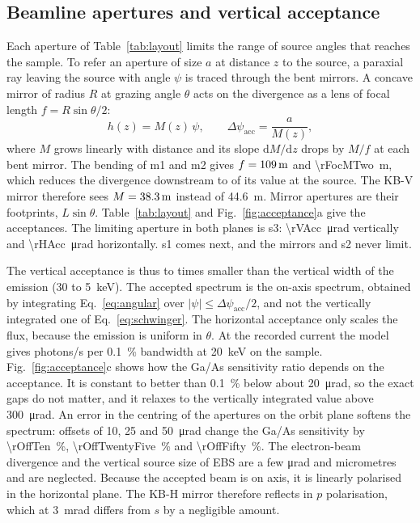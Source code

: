 \documentclass[11pt,a4paper]{article}
\newcommand{\dd}{\mathrm{d}}
\begin{document}
\subsection{Beamline apertures and vertical acceptance}\label{sec:acceptance}
Each aperture of Table~\ref{tab:layout} limits the range of source angles that reaches the sample. To
refer an aperture of size $a$ at distance $z$ to the source, a paraxial ray leaving the source with
angle $\psi$ is traced through the bent mirrors. A concave mirror of radius $R$ at grazing angle
$\theta$ acts on the divergence as a lens of focal length $f=R\sin\theta/2$:
\begin{equation}
h(z)=M(z)\,\psi,\qquad \Delta\psi_\mathrm{acc}=\frac{a}{M(z)} ,
\label{eq:acceptance}
\end{equation}
where $M$ grows linearly with distance and its slope $\dd M/\dd z$ drops by $M/f$ at each bent mirror.
The bending of m1 and m2 gives $f=\qty{109}{m}$ and \qty{\rFocMTwo}{m}, which reduces the
divergence downstream to \rDivGain{} of its value at the source. The KB-V mirror therefore sees
$M=\qty{38.3}{m}$ instead of \qty{44.6}{m}. Mirror apertures are their footprints, $L\sin\theta$.
Table~\ref{tab:layout} and Fig.~\ref{fig:acceptance}a give the acceptances. The limiting aperture in
both planes is s3: \qty{\rVAcc}{\micro\radian} vertically and \qty{\rHAcc}{\micro\radian} horizontally.
s1 comes next, and the mirrors and s2 never limit.

The vertical acceptance is thus \rAccRatioLo{} to \rAccRatioHi{} times smaller than the vertical width of the emission (\num{30} to \qty{5}{keV}). The
accepted spectrum is the on-axis spectrum, obtained by integrating Eq.~\eqref{eq:angular} over
$|\psi|\le\Delta\psi_\mathrm{acc}/2$, and not the vertically integrated one of Eq.~\eqref{eq:schwinger}.
The horizontal acceptance only scales the flux, because the emission is uniform in $\theta$. At the
recorded current the model gives \rFluxTwenty{} photons/s per \qty{0.1}{\percent} bandwidth at
\qty{20}{keV} on the sample. Fig.~\ref{fig:acceptance}c shows how the Ga/As sensitivity ratio depends
on the acceptance. It is constant to better than \qty{0.1}{\percent} below about \qty{20}{\micro\radian},
so the exact gaps do not matter, and it relaxes to the vertically integrated value above
\qty{300}{\micro\radian}. An error in the centring of the apertures on the orbit plane softens the
spectrum: offsets of \num{10}, \num{25} and \qty{50}{\micro\radian} change the Ga/As sensitivity by
\qty{\rOffTen}{\percent}, \qty{\rOffTwentyFive}{\percent} and \qty{\rOffFifty}{\percent}. The electron-beam
divergence and the vertical source size of EBS are a few \si{\micro\radian} and micrometres and are
neglected. Because the accepted beam is on axis, it is linearly polarised in the horizontal plane.
The KB-H mirror therefore reflects in $p$ polarisation, which at \qty{3}{mrad} differs from $s$ by a
negligible amount.
\end{document}
